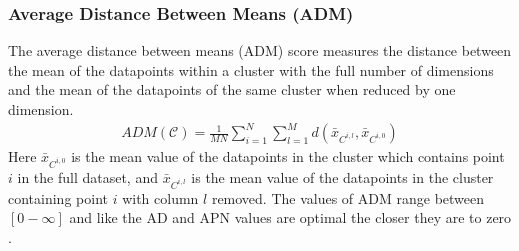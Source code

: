 \subsubsection{Average Distance Between Means (ADM)}
The average  distance between means (ADM) score  measures the distance
between  the mean of  the datapoints  within a  cluster with  the full
number  of dimensions  and  the mean  of  the datapoints  of the  same
cluster when reduced by one dimension.
\begin{gather}
ADM(\mathcal{C})= \frac{1}{MN} \sum_{i=1}^{N} \sum_{l=1}^{M}
d(\bar{x}_{C^{i,l}}, \bar{x}_{C^{i,0}})
\end{gather}  
Here $\bar{x}_{C^{i,0}}$  is the mean  value of the datapoints  in the
cluster   which  contains  point   $i$  in   the  full   dataset,  and
$\bar{x}_{C^{i,l}}$ is the mean value of the datapoints in the cluster
containing point $i$ with column $l$ removed.  The values of ADM range
between $[0-\infty]$  and like the AD  and APN values  are optimal the
closer they are to zero \cite{datta2003, brock2008}.






